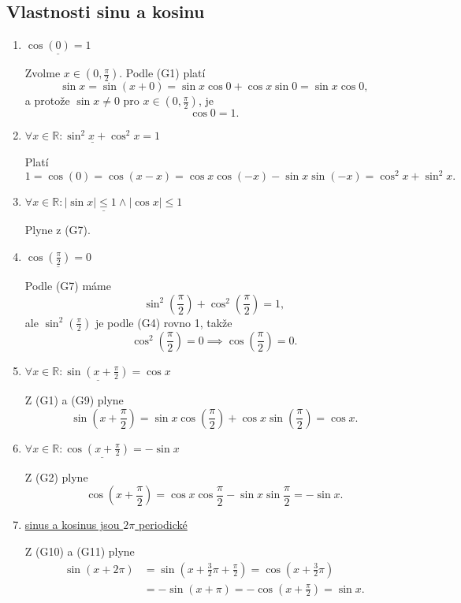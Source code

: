 \subsection{Vlastnosti sinu a kosinu}
\begin{enumerate}
	\item[(G6)] $\underline{\cos(0)=1}$
	\par Zvolme $x\in (0,\frac{\pi}{2})$. Podle (G1) platí
	$$\sin x = \sin(x+0)=\sin x \cos 0+\cos x \sin 0 = \sin x \cos 0,$$
	a protože $\sin x \ne 0$ pro $x\in (0,\frac{\pi}{2})$, je
	$$
	    \cos 0 = 1.
	$$
	\item[(G7)] $\underline{\forall x \in \mathbb R : \sin^2 x + \cos ^2 x = 1}$
	\par Platí
	$$
	    1= \cos(0)=\cos(x-x)=\cos x \cos(-x)-\sin x \sin(-x)=\cos^2 x+ \sin^2 x.
	$$
	\item[(G8)] $\underline{\forall x \in \mathbb R : |\sin x|\leq 1 \land |\cos x| \leq 1}$
	\par Plyne z (G7).
	\item[(G9)] $\underline{\cos\left (\frac{\pi}{2}\right)=0}$
	\par Podle (G7) máme
	$$
	    \sin^2 \left( \frac{\pi}{2} \right )  + \cos^2 \left( \frac{\pi}{2} \right ) = 1,
	$$
	ale $\sin^2 \left( \frac{\pi}{2} \right )$ je podle (G4) rovno 1, takže
	$$
	    \cos^2 \left( \frac{\pi}{2} \right ) = 0 \implies \cos \left( \frac{\pi}{2} \right ) =0.
	$$
	\item[(G10)] $\underline{\forall x \in \mathbb R : \sin \left( x+\frac{\pi}{2} \right )  = \cos x}$
	\par Z (G1) a (G9) plyne
	$$
	    \sin \left( x+\frac{\pi}{2} \right ) = \sin x \cos \left( \frac{\pi}{2} \right ) +\cos x \sin \left( \frac{\pi}{2} \right ) =\cos x.
	$$
	\item[(G11)] $\underline{\forall x \in \mathbb R : \cos \left( x+\frac{\pi}{2} \right ) = - \sin x }$
	\par Z (G2) plyne
	$$
	    \cos \left( x+ \frac{\pi}{2} \right ) = \cos x \cos \frac{\pi}{2} - \sin x \sin \frac{\pi}{2} = -\sin x.
	$$
	\item[(G12)] \underline{sinus a kosinus jsou $2\pi$ periodické}
	\par Z (G10) a (G11) plyne
	\begin{align*}
	\sin(x+2\pi) &= \sin \left( x+\frac{3}{2}\pi + \frac{\pi}{2} \right )  = \cos \left( x+ \frac{3}{2}\pi \right )\\
& = - \sin(x+\pi) = -\cos \left( x+\frac{\pi}{2} \right ) = \sin x.
\end{align*}

\end{enumerate}
